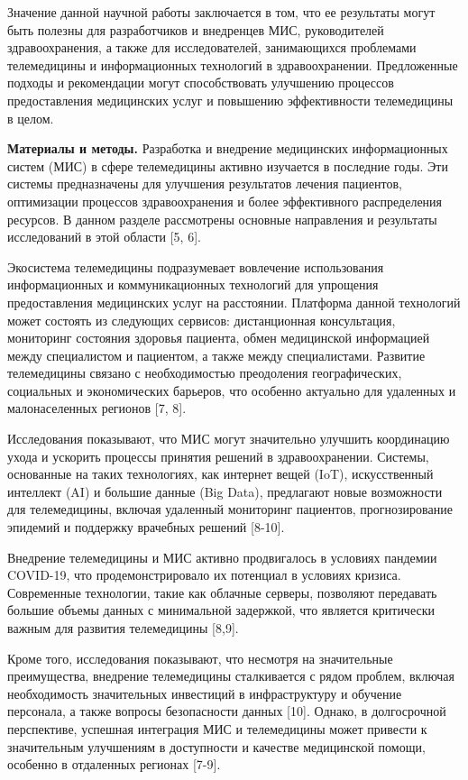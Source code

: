 \begin{multicols}{2}
Значение данной научной работы заключается в том, что ее результаты
могут быть полезны для разработчиков и внедренцев МИС, руководителей
здравоохранения, а также для исследователей, занимающихся проблемами
телемедицины и информационных технологий в здравоохранении. Предложенные
подходы и рекомендации могут способствовать улучшению процессов
предоставления медицинских услуг и повышению эффективности телемедицины
в целом.

{\bfseries Материалы и методы.} Разработка и внедрение медицинских
информационных систем (МИС) в сфере телемедицины активно изучается в
последние годы. Эти системы предназначены для улучшения результатов
лечения пациентов, оптимизации процессов здравоохранения и более
эффективного распределения ресурсов. В данном разделе рассмотрены
основные направления и результаты исследований в этой области {[}5,
6{]}.

Экосистема телемедицины подразумевает вовлечение использования
информационных и коммуникационных технологий для упрощения
предоставления медицинских услуг на расстоянии. Платформа данной
технологий может состоять из следующих сервисов: дистанционная
консультация, мониторинг состояния здоровья пациента, обмен медицинской
информацией между специалистом и пациентом, а также между специалистами.
Развитие телемедицины связано с необходимостью преодоления
географических, социальных и экономических барьеров, что особенно
актуально для удаленных и малонаселенных регионов {[}7, 8{]}.

Исследования показывают, что МИС могут значительно улучшить координацию
ухода и ускорить процессы принятия решений в здравоохранении. Системы,
основанные на таких технологиях, как интернет вещей (IoT), искусственный
интеллект (AI) и большие данные (Big Data), предлагают новые возможности
для телемедицины, включая удаленный мониторинг пациентов,
прогнозирование эпидемий и поддержку врачебных решений {[}8-10{]}.

Внедрение телемедицины и МИС активно продвигалось в условиях пандемии
COVID-19, что продемонстрировало их потенциал в условиях кризиса.
Современные технологии, такие как облачные серверы, позволяют передавать
большие объемы данных с минимальной задержкой, что является критически
важным для развития телемедицины {[}8,9{]}.

Кроме того, исследования показывают, что несмотря на значительные
преимущества, внедрение телемедицины сталкивается с рядом проблем,
включая необходимость значительных инвестиций в инфраструктуру и
обучение персонала, а также вопросы безопасности данных {[}10{]}.
Однако, в долгосрочной перспективе, успешная интеграция МИС и
телемедицины может привести к значительным улучшениям в доступности и
качестве медицинской помощи, особенно в отдаленных регионах {[}7-9{]}.


\end{multicols}
